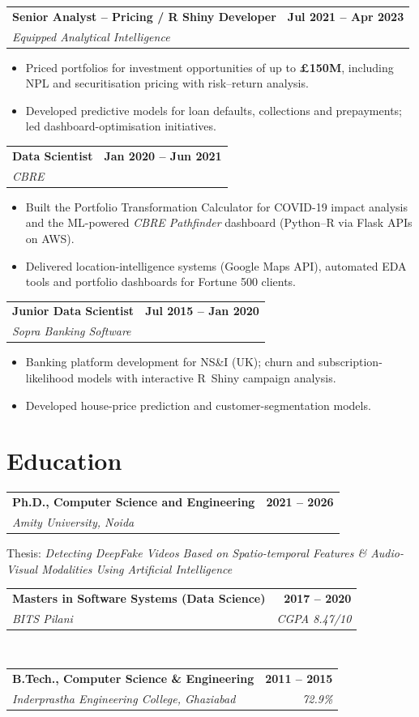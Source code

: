 \documentclass[a4paper,10pt]{article}
\makeatletter
\newcommand{\role}[4]{%
  \begin{tabularx}{\textwidth}{@{}X r@{}}
    \textbf{#1} & \textbf{#2}\\
    \textit{#3} & \textit{\color{muted}#4}\\
  \end{tabularx}\vspace{-3pt}}
\makeatother
\begin{document}
\role{Senior Analyst -- Pricing / R Shiny Developer}{Jul 2021 -- Apr 2023}{Equipped Analytical Intelligence}{}
\begin{itemize}
  \item Priced portfolios for investment opportunities of up to \textbf{\pounds150M}, including NPL and securitisation pricing with risk--return analysis.
  \item Developed predictive models for loan defaults, collections and prepayments; led dashboard-optimisation initiatives.
\end{itemize}

\role{Data Scientist}{Jan 2020 -- Jun 2021}{CBRE}{}
\begin{itemize}
  \item Built the Portfolio Transformation Calculator for COVID-19 impact analysis and the ML-powered \textit{CBRE Pathfinder} dashboard (Python--R via Flask APIs on AWS).
  \item Delivered location-intelligence systems (Google Maps API), automated EDA tools and portfolio dashboards for Fortune 500 clients.
\end{itemize}

\role{Junior Data Scientist}{Jul 2015 -- Jan 2020}{Sopra Banking Software}{}
\begin{itemize}
  \item Banking platform development for NS\&I (UK); churn and subscription-likelihood models with interactive R~Shiny campaign analysis.
  \item Developed house-price prediction and customer-segmentation models.
\end{itemize}

\section{Education}
\role{Ph.D., Computer Science and Engineering}{2021 -- 2026}{Amity University, Noida}{}
\small Thesis: \textit{Detecting DeepFake Videos Based on Spatio-temporal Features \& Audio-Visual Modalities Using Artificial Intelligence}\normalsize\\[3pt]
\role{Masters in Software Systems (Data Science)}{2017 -- 2020}{BITS Pilani}{CGPA 8.47/10}\\[3pt]
\role{B.Tech., Computer Science \& Engineering}{2011 -- 2015}{Inderprastha Engineering College, Ghaziabad}{72.9\%}

\end{document}
